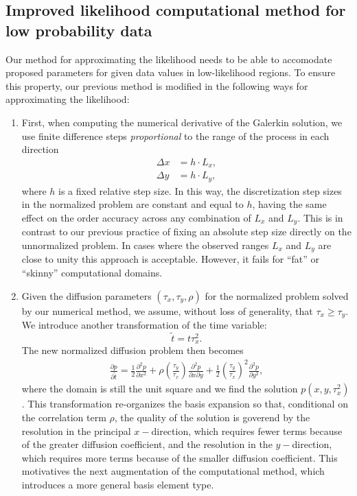 \documentclass[10pt]{article}
\begin{document}
\subsection{Improved likelihood computational method for low
  probability data} \label{sec:improvements}
Our method for approximating the likelihood needs to be able to
accomodate proposed parameters for given data values in low-likelihood
regions. To ensure this property, our previous method is modified in
the following ways for approximating the likelihood:
\begin{enumerate}
\item First, when computing the numerical derivative of the Galerkin
  solution, we use finite difference steps \textit{proportional} to
  the range of the process in each direction
  \begin{align}
    \Delta x &= h \cdot L_x, \\
    \Delta y &= h \cdot L_y,
  \end{align}
  where $h$ is a fixed relative step size. In this way, the
  discretization step sizes in the normalized problem are constant and
  equal to $h$, having the same effect on the order accuracy across
  any combination of $L_x$ and $L_y$. This is in contrast to our
  previous practice of fixing an absolute step size directly on the
  unnormalized problem. In cases where the observed ranges $L_x$ and
  $L_y$ are close to unity this approach is acceptable. However, it
  fails for ``fat'' or ``skinny'' computational domains.

\item Given the diffusion parameters $(\tau_x, \tau_y, \rho)$ for the
  normalized problem solved by our numerical method, we assume,
  without loss of generality, that $\tau_x \geq \tau_y$. We introduce
  another transformation of the time variable:
  \[ \tilde{t} = t\tau_x^2.\]
  The new normalized diffusion problem then becomes
  \begin{align}
    \frac{\partial p}{\partial \tilde{t}} = \frac{1}{2}
    \frac{\partial^2 p}{\partial x^2} + \rho
    \left(\frac{\tau_y}{\tau_x}\right)\frac{\partial^2 p}{\partial
      x\partial y} + \frac{1}{2}\left(\frac{\tau_y}{\tau_x}\right)^2
    \frac{\partial^2 p}{\partial y^2}, \label{eq:new-normalized}
  \end{align}
  where the domain is still the unit square and we find the solution
  $p(x,y,\tau_x^2)$. This transformation re-organizes the basis
  expansion so that, conditional on the correlation term $\rho$, the
  quality of the solution is goverend by the resolution in the
  principal $x-$direction, which requires fewer terms because of the
  greater diffusion coefficient, and the resolution in the
  $y-$direction, which requires more terms because of the smaller
  diffusion coefficient. This motivatives the next augmentation of the
  computational method, which introduces a more general basis element
  type.


\end{enumerate}
\end{document}
